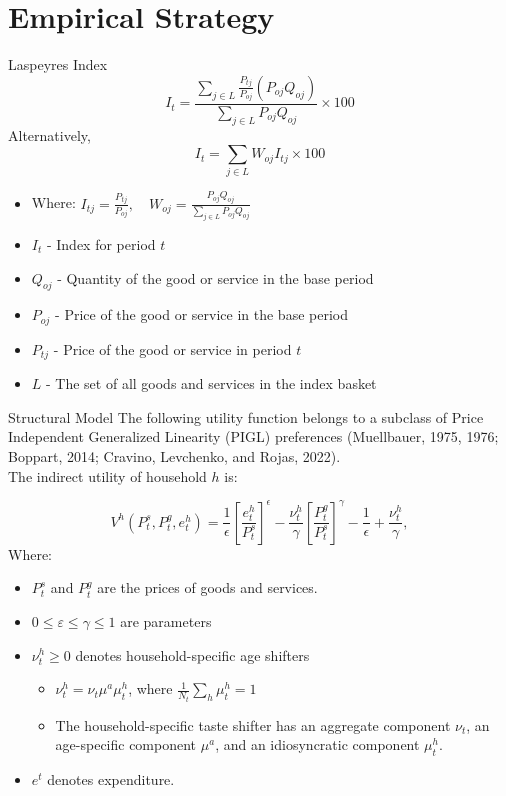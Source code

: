 \documentclass[10pt]{beamer}
\begin{document}
\section{Empirical Strategy}
\begin{frame}{Laspeyres Index}
	\[
		I_{t}=\frac{\sum_{j\in L}{\frac{P_{tj}}{P_{oj}}(P_{oj}Q_{oj})}}{\sum_{j\in L}P_{oj}Q_{oj}} \times 100
	\]
	Alternatively,
	\[
		I_{t}=\sum_{j\in L}W_{oj}I_{tj}\times 100
	\]
	\begin{itemize}


		\item Where: \( I_{tj} = \frac{P_{tj}}{P_{oj}}, \quad W_{oj} = \frac{P_{oj}Q_{oj}}{\sum_{j \in L} P_{oj}Q_{oj}} \)
		\item \( I_{t} \) - Index for period \( t \)
		\item \( Q_{oj} \) - Quantity of the good or service in the base period
		\item \( P_{oj} \) - Price of the good or service in the base period
		\item \( P_{tj} \) - Price of the good or service in period \( t \)
		\item \( L \) - The set of all goods and services in the index basket
	\end{itemize}
\end{frame}


\begin{frame}{Structural Model}
	The following utility function belongs to a subclass of Price Independent Generalized Linearity (PIGL) preferences (Muellbauer, 1975, 1976; Boppart, 2014; Cravino, Levchenko, and Rojas, 2022). \\
	The indirect utility of household \(h\) is:

	\[V^{h}\left(P_{t}^{s},P_{t}^{g},e_{t}^{h}\right)=\frac{1}{\epsilon}\left[\frac{e_{t}^{h}}{P_{t}^{s}}\right]^{\epsilon}-\frac{\nu_{t}^{h}}{\gamma}\left[\frac{P_{t}^{g}}{P_{t}^{s}}\right]^{\gamma}-\frac{1}{\epsilon}+\frac{\nu_{t}^{h}}{\gamma},\]
	Where:
	\begin{itemize}
		\item \(P_{t}^s\) and \(P^g_{t}\) are the prices of goods and services.
		\item \(0 \leq \varepsilon \leq \gamma \leq 1\) are parameters
		\item \(\nu_{t}^h \geq 0\) denotes household-specific age shifters
		      \begin{itemize}
			      \item \(\nu_{t}^h=\nu_{t}\mu^a\mu_{t}^h\), where \(\frac{1}{N_{t}}\sum_{h}\mu_{t}^h=1\)
			      \item The household-specific taste shifter has an aggregate component \( \nu_{t} \), an age-specific component \( \mu^a \), and an idiosyncratic component \( \mu_{t}^h \).
		      \end{itemize}
		\item \(e^t\) denotes expenditure.

	\end{itemize}
\end{frame}
\end{document}
